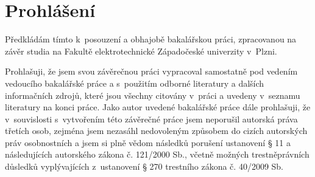 \chapter*{Prohlášení}
Předkládám tímto k~posouzení a obhajobě bakalářskou práci, zpracovanou na závěr studia na Fakultě elektrotechnické Západočeské univerzity v~Plzni.

Prohlašuji, že jsem svou závěrečnou práci vypracoval samostatně pod vedením vedoucího bakalářské práce a s~použitím odborné literatury a dalších informačních zdrojů, které jsou všechny citovány v~práci a uvedeny v~seznamu literatury na konci práce. Jako autor uvedené bakalářské práce dále prohlašuji, že v~souvislosti s~vytvořením této závěrečné práce jsem neporušil autorská práva třetích osob, zejména jsem nezasáhl nedovoleným způsobem do cizích autorských práv osobnostních a jsem si plně vědom následků po\-ru\-še\-ní ustanovení § 11 a následujících autorského zákona č. 121/2000 Sb., včetně možných trestněprávních důsledků vyplývajících z~ustanovení § 270 trestního zákona č. 40/2009 Sb.